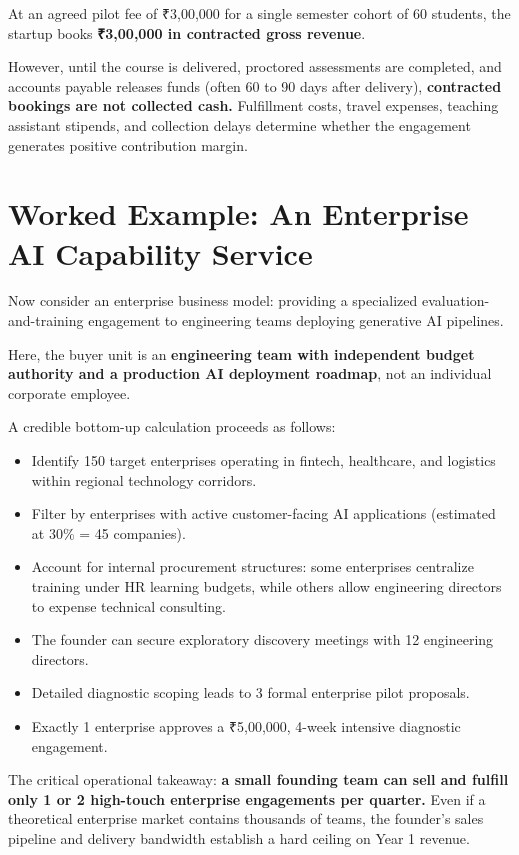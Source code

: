 At an agreed pilot fee of ₹3,00,000 for a single semester cohort of 60 students, the startup books \textbf{₹3,00,000 in contracted gross revenue}.

However, until the course is delivered, proctored assessments are completed, and accounts payable releases funds (often 60 to 90 days after delivery), \textbf{contracted bookings are not collected cash.} Fulfillment costs, travel expenses, teaching assistant stipends, and collection delays determine whether the engagement generates positive contribution margin.

\section{Worked Example: An Enterprise AI Capability Service}

Now consider an enterprise business model: providing a specialized evaluation-and-training engagement to engineering teams deploying generative AI pipelines.

Here, the buyer unit is an \textbf{engineering team with independent budget authority and a production AI deployment roadmap}, not an individual corporate employee.

A credible bottom-up calculation proceeds as follows:
\begin{itemize}[leftmargin=12pt,itemsep=1pt,topsep=1pt]
  \item Identify 150 target enterprises operating in fintech, healthcare, and logistics within regional technology corridors.
  \item Filter by enterprises with active customer-facing AI applications (estimated at 30\% = 45 companies).
  \item Account for internal procurement structures: some enterprises centralize training under HR learning budgets, while others allow engineering directors to expense technical consulting.
  \item The founder can secure exploratory discovery meetings with 12 engineering directors.
  \item Detailed diagnostic scoping leads to 3 formal enterprise pilot proposals.
  \item Exactly 1 enterprise approves a ₹5,00,000, 4-week intensive diagnostic engagement.
\end{itemize}

The critical operational takeaway: \textbf{a small founding team can sell and fulfill only 1 or 2 high-touch enterprise engagements per quarter.} Even if a theoretical enterprise market contains thousands of teams, the founder's sales pipeline and delivery bandwidth establish a hard ceiling on Year 1 revenue.
